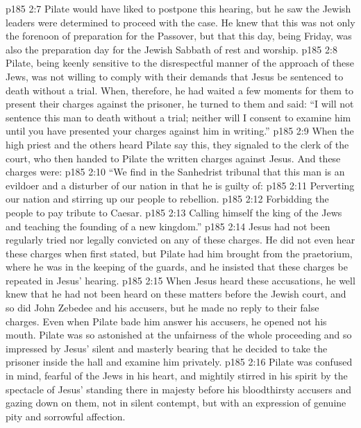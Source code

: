 \vs p185 2:7 \pc Pilate would have liked to postpone this hearing, but he saw the Jewish leaders were determined to proceed with the case. He knew that this was not only the forenoon of preparation for the Passover, but that this day, being Friday, was also the preparation day for the Jewish Sabbath of rest and worship.
\vs p185 2:8 Pilate, being keenly sensitive to the disrespectful manner of the approach of these Jews, was not willing to comply with their demands that Jesus be sentenced to death without a trial. When, therefore, he had waited a few moments for them to present their charges against the prisoner, he turned to them and said: “I will not sentence this man to death without a trial; neither will I consent to examine him until you have presented your charges against him in writing.”
\vs p185 2:9 When the high priest and the others heard Pilate say this, they signaled to the clerk of the court, who then handed to Pilate the written charges against Jesus. And these charges were:
\vs p185 2:10 \pc “We find in the Sanhedrist tribunal that this man is an evildoer and a disturber of our nation in that he is guilty of:
\vs p185 2:11 \bibnobreakspace Perverting our nation and stirring up our people to rebellion.
\vs p185 2:12 \bibnobreakspace Forbidding the people to pay tribute to Caesar.
\vs p185 2:13 \bibnobreakspace Calling himself the king of the Jews and teaching the founding of a new kingdom.”
\vs p185 2:14 \pc Jesus had not been regularly tried nor legally convicted on any of these charges. He did not even hear these charges when first stated, but Pilate had him brought from the praetorium, where he was in the keeping of the guards, and he insisted that these charges be repeated in Jesus’ hearing.
\vs p185 2:15 When Jesus heard these accusations, he well knew that he had not been heard on these matters before the Jewish court, and so did John Zebedee and his accusers, but he made no reply to their false charges. Even when Pilate bade him answer his accusers, he opened not his mouth. Pilate was so astonished at the unfairness of the whole proceeding and so impressed by Jesus’ silent and masterly bearing that he decided to take the prisoner inside the hall and examine him privately.
\vs p185 2:16 Pilate was confused in mind, fearful of the Jews in his heart, and mightily stirred in his spirit by the spectacle of Jesus’ standing there in majesty before his bloodthirsty accusers and gazing down on them, not in silent contempt, but with an expression of genuine pity and sorrowful affection.
